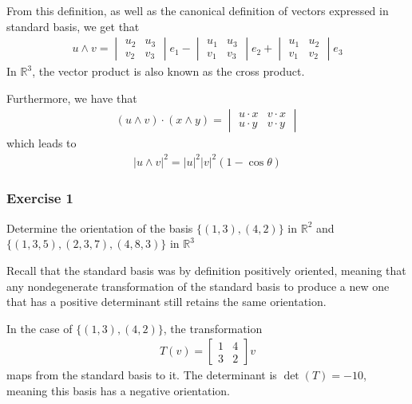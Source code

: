 \documentclass{article}
\newcommand{\R}{\mathbb{R}}
\begin{document}
	From this definition, as well as the canonical definition of vectors expressed in standard basis, we get that
	\begin{gather*}
		u \wedge v = \begin{vmatrix} u_2 & u_3 \\ v_2 & v_3 \end{vmatrix} e_1 -
		\begin{vmatrix} u_1 & u_3 \\ v_1 & v_3 \end{vmatrix} e_2 +
		\begin{vmatrix} u_1 & u_2 \\ v_1 & v_2 \end{vmatrix} e_3
	\end{gather*}
	In $\R^3$, the vector product is also known as the cross product.
	
	Furthermore, we have that
	\begin{gather*}
		(u \wedge v) \cdot (x \wedge y) = \begin{vmatrix}
			u \cdot x & v \cdot x \\
			u \cdot y & v \cdot y
		\end{vmatrix}
	\end{gather*}
	which leads to
	\begin{gather*}
		|u \wedge v|^2 = |u|^2|v|^2 (1 - \cos \theta)
	\end{gather*}
	
	\subsubsection*{Exercise 1}
	Determine the orientation of the basis $\{(1, 3), (4, 2)\}$ in $\R^2$ and $\{(1, 3, 5), (2, 3, 7), (4, 8, 3)\}$ in $\R^3$
	
	Recall that the standard basis was by definition positively oriented, meaning that any nondegenerate transformation of the standard basis to produce a new one that has a positive determinant still retains the same orientation.
	
	In the case of $\{(1, 3), (4, 2)\}$, the transformation
	\begin{gather*}
		T \left( v \right) = \begin{bmatrix}
			1 & 4 \\
			3 & 2
		\end{bmatrix} v
	\end{gather*}
	maps from the standard basis to it. The determinant is $\det(T) = -10$, meaning this basis has a negative orientation.
	
\end{document}
